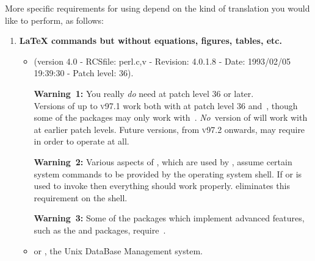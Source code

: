 \medskip\htmlrule
\medskip\noindent
More specific requirements for using \latextohtml{} 
depend on the kind of translation you would like to perform, as follows:
%
\begin{enumerate}
\item 
{}%
\textbf{\LaTeX{}  commands but without equations, figures, tables, etc.} \hfill
\begin{itemize}
\item 
{}
\begin{small}
(version 4.0 - RCSfile: perl.c,v - Revision: 4.0.1.8 - Date:
1993/02/05 19:39:30 - Patch level: 36).
\end{small}\html{\smallskip}

\textbf{Warning~1: }%
You really \emph{do} need \Perl{} at patch level 36 or later.\\
Versions of \latextohtml{} up to \textsc{v97.1} work 
both with  at patch level 36 and \,,
though some of the packages may only work with \,.\html{\\}
\emph{No}~version 
of \latextohtml{} will work  with  at earlier patch levels.\html{\\}
Future versions, from \textsc{v97.2} onwards, 
may require  in order to operate at all.


\textbf{Warning~2: }%
Various aspects of \Perl{}, which are used by \latextohtml{}, assume 
certain system commands to be provided by the operating system shell.
If  or  is used to invoke \latextohtml{}
then everything should work properly.
 eliminates this requirement on the shell.

\textbf{Warning~3: }%
Some of the packages which implement advanced features,
such as the  and  packages,
require \,.

%
\item 
{} or , the Unix DataBase Management system.
\end{itemize}


\end{enumerate}

